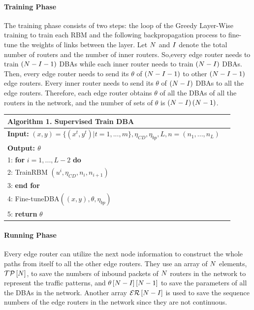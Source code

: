 \documentclass[11pt]{report}
\begin{document}
	\paragraph{Training Phase}
    The training phase consists of two steps: the loop of the Greedy Layer-Wise training to train each RBM and the following backpropagation process to fine-tune the weights of links between the layer. Let $\mathnormal{N}$ and $\mathnormal{I}$ denote the total number of routers and the number of inner routers. So,every edge router needs to train $\left(\mathnormal{N} - \mathnormal{I} - 1\right)$ DBAs while each inner router needs to train $\left(\mathnormal{N} - \mathnormal{I}\right)$ DBAs. Then, every edge router needs to send its $\theta$ of $\left(\mathnormal{N} - \mathnormal{I} -1\right)$ to other $\left(\mathnormal{N} - \mathnormal{I} -1\right)$ edge routers. Every inner router needs to send its $\theta$ of $\left(\mathnormal{N} - \mathnormal{I}\right)$ DBAs to all the edge routers. Therefore, each edge router obtains $\theta$ of all the DBAs of all the routers in the network, and the number of sets of $\theta$ is $\left(\mathnormal{N} - \mathnormal{I}\right)\left(\mathnormal{N} - 1\right)$.\\
     
	\begin{tabular}{lc}
		\toprule
		\textbf{Algorithm 1}. Supervised Train DBA\\
		\hline
		\textbf{Input:} $\left(x,y\right)=\{\left(x^t,y^t\right)|t=1,...,m\}, \eta_{CD}, \eta_{bp},L, n=\left(n_1,...,n_L\right)$\\
		\textbf{Output: $\theta$}\\
		1: \textbf{for} $i=1,...,L-2$ \textbf{do}\\
		2: \quad TrainRBM $\left(u^i,\eta_{CD},n_i,n_{i+1}\right)$\\
		3: \textbf{end for}\\
		4: Fine-tuneDBA$\left(\left(x,y\right),\theta,\eta_{bp}\right)$\\
		5: \textbf{return} $\theta$\\
		\hline
	\end{tabular}

	\paragraph{Running Phase} 
	Every edge router can utilize the next node information to construct the whole paths from itself to all the other edge routers. They use an array of $\mathnormal{N}$ elements, $\mathcal{TP}\left[\mathnormal{N}\right]$, to save the numbers of inbound packets of $\mathnormal{N}$ routers in the network to represent the traffic patterns, and $\theta\left[\mathnormal{N} - \mathnormal{I}\right]\left[\mathnormal{N} - 1\right]$ to save the parameters of all the DBAs in the network. Another array $\mathcal{ER}\left[\mathnormal{N} - \mathnormal{I}\right]$ is used to save the sequence numbers of the edge routers in the network since they are not continuous.\\
	
\end{document}
